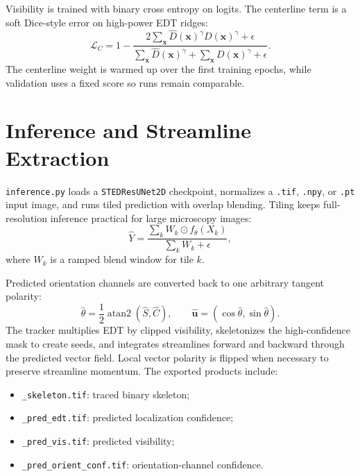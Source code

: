 \documentclass[11pt, a4paper]{article}
\begin{document}
Visibility is trained with binary cross entropy on logits. The centerline term is
a soft Dice-style error on high-power EDT ridges:
\begin{equation}
    \mathcal{L}_{C} =
    1 -
    \frac{2\sum_{\bm{x}} \hat{D}(\bm{x})^\gamma D(\bm{x})^\gamma + \epsilon}
    {\sum_{\bm{x}} \hat{D}(\bm{x})^\gamma +
     \sum_{\bm{x}} D(\bm{x})^\gamma + \epsilon}.
\end{equation}
The centerline weight is warmed up over the first training epochs, while
validation uses a fixed score so runs remain comparable.

\section{Inference and Streamline Extraction}

\texttt{inference.py} loads a \texttt{STEDResUNet2D} checkpoint, normalizes a
\texttt{.tif}, \texttt{.npy}, or \texttt{.pt} input image, and runs tiled
prediction with overlap blending. Tiling keeps full-resolution inference
practical for large microscopy images:
\begin{equation}
    \hat{Y} =
    \frac{\sum_k W_k \odot f_{\theta}(X_k)}
         {\sum_k W_k + \epsilon},
\end{equation}
where $W_k$ is a ramped blend window for tile $k$.

Predicted orientation channels are converted back to one arbitrary tangent
polarity:
\begin{equation}
    \hat{\theta} = \frac{1}{2}\operatorname{atan2}(\hat{S}, \hat{C}),
    \qquad
    \hat{\bm{u}} = (\cos\hat{\theta}, \sin\hat{\theta}).
\end{equation}
The tracker multiplies EDT by clipped visibility, skeletonizes the high-confidence
mask to create seeds, and integrates streamlines forward and backward through the
predicted vector field. Local vector polarity is flipped when necessary to
preserve streamline momentum. The exported products include:
\begin{itemize}
    \item \texttt{\_skeleton.tif}: traced binary skeleton;
    \item \texttt{\_pred\_edt.tif}: predicted localization confidence;
    \item \texttt{\_pred\_vis.tif}: predicted visibility;
    \item \texttt{\_pred\_orient\_conf.tif}: orientation-channel confidence.
\end{itemize}
\end{document}
